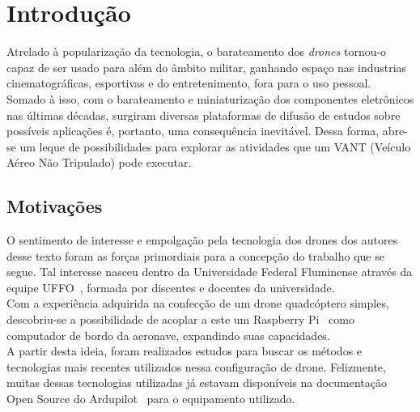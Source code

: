 \documentclass[12pt,a4paper,oneside]{book}
\begin{document}
\clearpage



%




\chapter{Introdução}
%
\thispagestyle{empty} 
%
%
Atrelado à popularização da tecnologia, o barateamento dos \textit{drones} tornou-o capaz de ser usado para além do âmbito militar, 
ganhando espaço nas industrias cinematográficas, esportivas e do entretenimento, fora para o uso pessoal.\\
Somado à isso, com o barateamento e miniaturização dos componentes eletrônicos nas últimas décadas, surgiram diversas plataformas de 
difusão de estudos sobre possíveis aplicações é, portanto, uma consequência inevitável. Dessa forma, abre-se um leque de possibilidades 
para explorar as atividades que um VANT (Veículo Aéreo Não Tripulado) pode executar.\\



\section{Motivações}

O sentimento de interesse e empolgação pela tecnologia dos drones dos autores desse texto foram as forças primordiais para a concepção 
do trabalho que se segue. Tal interesse nasceu dentro da Universidade Federal Fluminense através da equipe UFFO~\cite{url:equipeuffo}, 
formada por discentes e docentes da universidade.\\
Com a experiência adquirida na confecção de um drone quadcóptero simples, descobriu-se a possibilidade de acoplar a este um 
Raspberry Pi~\cite{url:raspberrypi} como computador de bordo da aeronave, expandindo suas capacidades.\\
A partir desta ideia, foram realizados estudos para buscar os métodos e tecnologias mais recentes utilizados nessa configuração de drone. 
Felizmente, muitas dessas tecnologias utilizadas já estavam disponíveis na documentação Open Source do Ardupilot~\cite{url:ardupilotdoc} 
para o equipamento utilizado.
\end{document}

